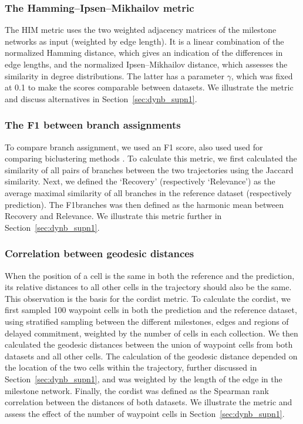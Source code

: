 \subsubsection{The Hamming–Ipsen–Mikhailov metric}

The HIM metric \cite{jurman_himglocalmetric_2015} uses the two weighted adjacency matrices of the milestone networks as input (weighted by edge length). It is a linear combination of the normalized Hamming distance, which gives an indication of the differences in edge lengths, and the normalized Ipsen–Mikhailov distance, which assesses the similarity in degree distributions. The latter has a parameter $\gamma$, which was fixed at 0.1 to make the scores comparable between datasets. We illustrate the metric and discuss alternatives in Section~\ref{sec:dynb_supn1}.

\subsubsection{The F1 between branch assignments}

To compare branch assignment, we used an F1 score, also used used for comparing biclustering methods \cite{saelens_comprehensiveevaluationmodule_2018}. To calculate this metric, we first calculated the similarity of all pairs of branches between the two trajectories using the Jaccard similarity. Next, we defined the ‘Recovery' (respectively ‘Relevance') as the average maximal similarity of all branches in the reference dataset (respectively prediction). The F1branches was then defined as the harmonic mean between Recovery and Relevance. We illustrate this metric further in Section~\ref{sec:dynb_supn1}.

\subsubsection{Correlation between geodesic distances}

When the position of a cell is the same in both the reference and the prediction, its relative distances to all other cells in the trajectory should also be the same. This observation is the basis for the cordist metric. To calculate the cordist, we first sampled 100 waypoint cells in both the prediction and the reference dataset, using stratified sampling between the different milestones, edges and regions of delayed commitment, weighted by the number of cells in each collection. We then calculated the geodesic distances between the union of waypoint cells from both datasets and all other cells. The calculation of the geodesic distance depended on the location of the two cells within the trajectory, further discussed in Section~\ref{sec:dynb_supn1}, and was weighted by the length of the edge in the milestone network. Finally, the cordist was defined as the Spearman rank correlation between the distances of both datasets. We illustrate the metric and assess the effect of the number of waypoint cells in Section~\ref{sec:dynb_supn1}.

